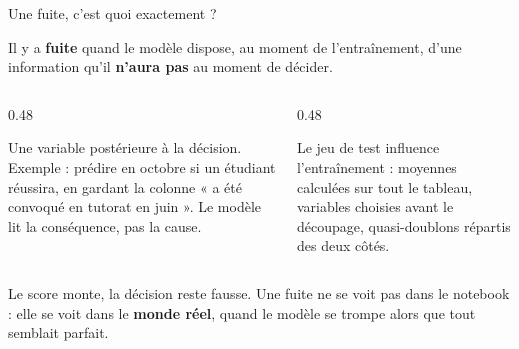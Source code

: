 \begin{frame}{Une fuite, c'est quoi exactement ?}
\begin{solbox}[Définition]
Il y a \textbf{fuite} quand le modèle dispose, au moment de l'entraînement,
d'une information qu'il \textbf{n'aura pas} au moment de décider.
\end{solbox}
\vspace{1mm}
\begin{columns}[t]
\begin{column}{0.48\textwidth}
\begin{wbox}
Une variable postérieure à la décision. Exemple : prédire en octobre si un
étudiant réussira, en gardant la colonne « a été convoqué en tutorat en juin ».
Le modèle lit la conséquence, pas la cause.
\end{wbox}
\end{column}
\begin{column}{0.48\textwidth}
\begin{wbox}
Le jeu de test influence l'entraînement : moyennes calculées sur tout le
tableau, variables choisies avant le découpage, quasi-doublons répartis des
deux côtés.
\end{wbox}
\end{column}
\end{columns}
\vspace{1mm}
\begin{kbox}
Le score monte, la décision reste fausse. Une fuite ne se voit pas dans le
notebook : elle se voit dans le \textbf{monde réel}, quand le modèle se trompe
alors que tout semblait parfait.
\end{kbox}
\end{frame}

